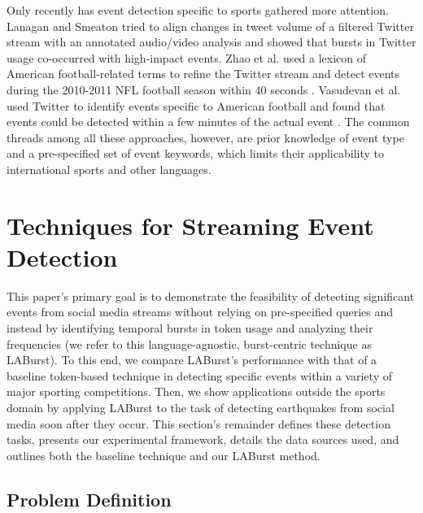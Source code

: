 \documentclass{acm_proc_article-sp}
\begin{document}
{Only recently has event detection specific to sports gathered more attention.
Lanagan and Smeaton tried to align changes in tweet volume of a filtered Twitter stream with an annotated audio/video analysis and showed that bursts in Twitter usage co-occurred with high-impact events\cite{lanagan2011using}.
Zhao et al. used a lexicon of American football-related terms to refine the Twitter stream and detect events during the 2010-2011 NFL football season within 40 seconds \cite{Zhao2011}.
Vasudevan et al. used Twitter to identify events specific to American football and found that events could be detected within a few minutes of the actual event \cite{vasudevan2013twitter}.
The common threads among all these approaches, however, are prior knowledge of event type and a pre-specified set of event keywords, which limits their applicability to international sports and other languages.
}

\section{Techniques for Streaming Event Detection}
\label{sect:methods}

This paper's primary goal is to demonstrate the feasibility of detecting significant events from social media streams without relying on pre-specified queries and instead by identifying temporal bursts in token usage and analyzing their frequencies (we refer to this language-agnostic, burst-centric technique as LABurst).
To this end, we compare LABurst's performance with that of a baseline token-based technique in detecting specific events within a variety of major sporting competitions.
Then, we show applications outside the sports domain by applying LABurst to the task of detecting earthquakes from social media soon after they occur.
This section's remainder defines these detection tasks, presents our experimental framework, details the data sources used, and outlines both the baseline technique and our LABurst method.

\subsection{Problem Definition}
\end{document}

